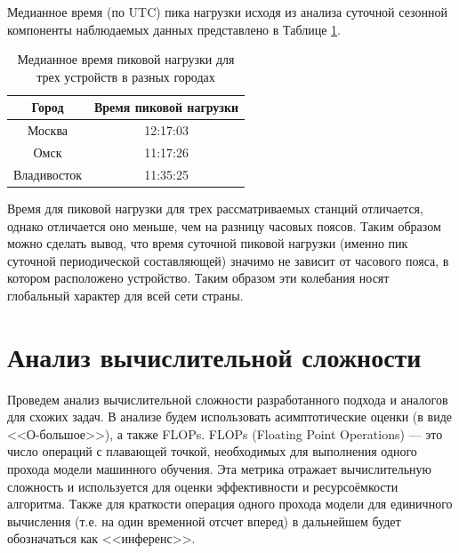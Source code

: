 Медианное время (по UTC) пика нагрузки исходя из анализа суточной сезонной компоненты наблюдаемых данных представлено в Таблице \ref{tab:cities}.

\begin{table}[h!]
	\caption{Медианное время пиковой нагрузки для трех устройств в разных городах}
	\centering
	\begin{tabular}{|c|c|}
		\hline
		Город & Время пиковой нагрузки  \\ \hline
		Москва & 12:17:03  \\ \hline
		Омск & 11:17:26  \\ \hline
		Владивосток & 11:35:25  \\ \hline
	\end{tabular}
	\label{tab:cities}
\end{table}


Время для пиковой нагрузки для трех рассматриваемых станций отличается, однако отличается оно меньше, чем на разницу часовых поясов. Таким образом можно сделать вывод, что время суточной пиковой нагрузки (именно пик суточной периодической составляющей) значимо не зависит от часового пояса, в котором расположено устройство. Таким образом эти колебания носят глобальный характер для всей сети страны.

\section{Анализ вычислительной сложности}\label{subsec:ch4/sect4}

Проведем анализ вычислительной сложности разработанного подхода и аналогов для схожих задач. В анализе будем использовать асимптотические оценки (в виде <<О-большое>>), а также FLOPs. FLOPs (Floating Point Operations) — это число операций с плавающей точкой, необходимых для выполнения одного прохода модели машинного обучения. Эта метрика отражает вычислительную сложность и используется для оценки эффективности и ресурсоёмкости алгоритма. Также для краткости  операция одного прохода модели для единичного вычисления (т.е. на один временной отсчет вперед) в дальнейшем будет обозначаться как <<инференс>>.


